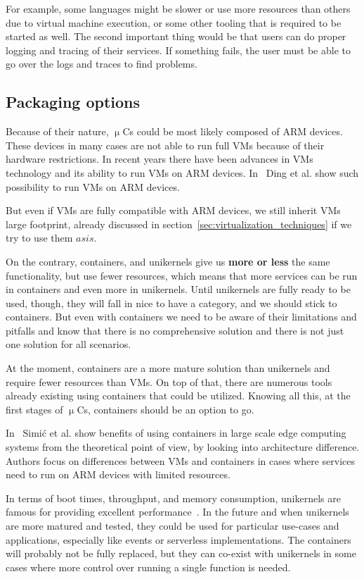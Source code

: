 For example, some languages might be slower or use more resources than others due to virtual machine execution, or some other tooling that is required to be started as well. The second important thing would be that users can do proper logging and tracing of their services. If something fails, the user must be able to go over the logs and traces to find problems.
%
\subsection{Packaging options}\label{sec:packaging}
%
Because of their nature, $\upmu$Cs could be most likely composed of ARM devices. These devices in many cases are not able to run full VMs because of their hardware restrictions. In recent years there have been advances in VMs technology and its ability to run VMs on ARM devices. In~\cite{Ding12armvisor} Ding et al. show such possibility to run VMs on ARM devices.

But even if VMs are fully compatible with ARM devices, we still inherit VMs large footprint, already discussed in section~\ref{sec:virtualization_techniques} if we try to use them $as is$.

On the contrary, containers, and unikernels give us \textbf{more or less} the same functionality, but use fewer resources, which means that more services can be run in containers and even more in unikernels. Until unikernels are fully ready to be used, though, they will fall in nice to have a category, and we should stick to containers. But even with containers we need to be aware of their limitations and pitfalls and know that there is no comprehensive solution and there is not just one solution for all scenarios.

At the moment, containers are a more mature solution than unikernels and require fewer resources than VMs. On top of that, there are numerous tools already existing using containers that could be utilized. Knowing all this, at the first stages of $\upmu$Cs, containers should be an option to go. 

In~\cite{inproceedingsSimic3} Simi\' c et al. show benefits of using containers in large scale edge computing systems from the theoretical point of view, by looking into architecture difference. Authors focus on differences between VMs and containers in cases where services need to run on ARM devices with limited resources.

In terms of boot times, throughput, and memory consumption, unikernels are famous for providing excellent performance~\cite{abs-2104-12721}. In the future and when unikernels are more matured and tested, they could be used for particular use-cases and applications, especially like events or serverless implementations. The containers will probably not be fully replaced, but they can co-exist with unikernels in some cases where more control over running a single function is needed.

